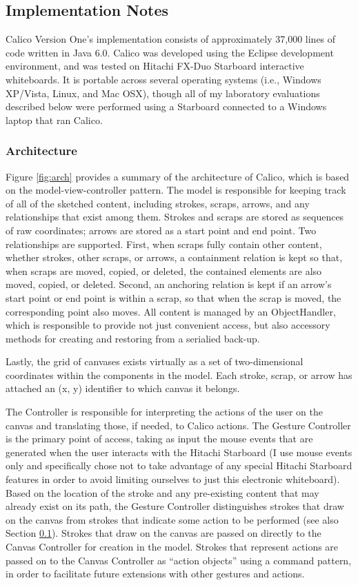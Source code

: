 \documentclass[12pt,fleqn]{ucithesis}
\begin{document}
\subsection {Implementation Notes}
\label{calico:5}

Calico Version One's implementation consists of approximately 37,000 lines of code written in Java 6.0. Calico was developed using the Eclipse development environment, and was tested on Hitachi FX-Duo Starboard interactive whiteboards. It is portable across several operating systems (i.e., Windows XP/Vista, Linux, and Mac OSX), though all of my laboratory evaluations described below were performed using a Starboard connected to a Windows laptop that ran Calico. 

\subsubsection {Architecture}
\label{calico:5.1}

Figure \ref{fig:arch} provides a summary of the architecture of Calico, which is based on the model-view-controller pattern. The model is responsible for keeping track of all of the sketched content, including strokes, scraps, arrows, and any relationships that exist among them. Strokes and scraps are stored as sequences of raw coordinates; arrows are stored as a start point and end point. Two relationships are supported. First, when scraps fully contain other content, whether strokes, other scraps, or arrows, a containment relation is kept so that, when scraps are moved, copied, or deleted, the contained elements are also moved, copied, or deleted. Second, an anchoring relation is kept if an arrow's start point or end point is within a scrap, so that when the scrap is moved, the corresponding point also moves. All content is managed by an ObjectHandler, which is responsible to provide not just convenient access, but also accessory methods for creating and restoring from a serialied back-up. 

Lastly, the grid of canvases exists virtually as a set of two-dimensional coordinates within the components in the model. Each stroke, scrap, or arrow has attached an (x, y) identifier to which canvas it belongs. 

The Controller is responsible for interpreting the actions of the user on the canvas and translating those, if needed, to Calico actions. The Gesture Controller is the primary point of access, taking as input the mouse events that are generated when the user interacts with the Hitachi Starboard (I use mouse events only and specifically chose not to take advantage of any special Hitachi Starboard features in order to avoid limiting ourselves to just this electronic whiteboard). Based on the location of the stroke and any pre-existing content that may already exist on its path, the Gesture Controller distinguishes strokes that draw on the canvas from strokes that indicate some action to be performed (see also Section \ref{calico:5}). Strokes that draw on the canvas are passed on directly to the Canvas Controller for creation in the model. Strokes that represent actions are passed on to the Canvas Controller as ``action objects'' using a command pattern, in order to facilitate future extensions with other gestures and actions.
\end{document}
